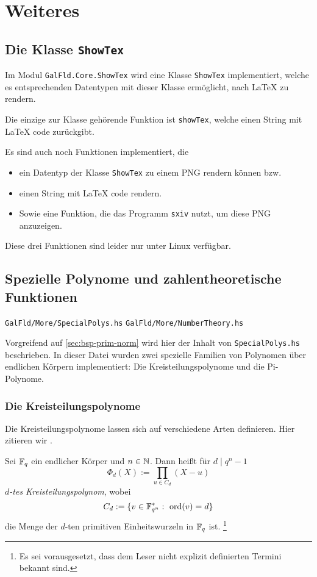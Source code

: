 \section{Weiteres}
\subsection{Die Klasse \texttt{ShowTex}}
Im Modul \texttt{GalFld.Core.ShowTex} wird eine Klasse \texttt{ShowTex}
implementiert, welche es entsprechenden Datentypen mit dieser Klasse
ermöglicht, nach \LaTeX{} zu rendern.

Die einzige zur Klasse gehörende Funktion ist \texttt{showTex}, welche einen
String mit \LaTeX{} code zurückgibt.

Es sind auch noch Funktionen implementiert, die 
\begin{itemize}
  \item ein Datentyp der Klasse \texttt{ShowTex} zu einem PNG rendern können
    bzw.
  \item einen String mit \LaTeX{} code rendern.
  \item Sowie eine Funktion, die das Programm \texttt{sxiv} nutzt, um diese PNG
    anzuzeigen.
\end{itemize}
Diese drei Funktionen sind leider nur unter Linux verfügbar.


\subsection{Spezielle Polynome und zahlentheoretische Funktionen}

\texttt{GalFld/More/SpecialPolys.hs}
\texttt{GalFld/More/NumberTheory.hs}

Vorgreifend auf \autoref{sec:bsp-prim-norm} wird hier der Inhalt von 
\texttt{SpecialPolys.hs} beschrieben. In dieser Datei wurden zwei spezielle
Familien von Polynomen über endlichen Körpern implementiert: Die
Kreisteilungspolynome und die Pi-Polynome.

\subsubsection{Die Kreisteilungspolynome}

Die Kreisteilungspolynome lassen sich auf verschiedene Arten definieren. Hier
zitieren wir \cite[Abschnitt 4]{hach2013eki}.

\begin{definition}[Kreisteilungspolynom]
  Sei $\mathbb{F}_q$ ein endlicher Körper und $n\in \mathbb{N}$. Dann heißt für 
  $d\mid q^n-1$
  \[ \Phi_d(X) := \prod_{u \in C_d} (X-u)\]
  \emph{$d$-tes Kreisteilungspolynom}, wobei
  \[ C_d := \{ v\in \mathbb{F}_{q^n}^\ast:\ \operatorname{ord}(v) = d\}\]
  die Menge der $d$-ten primitiven Einheitswurzeln in $\mathbb{F}_q$ ist.%
  \footnote{Es sei vorausgesetzt, dass dem Leser nicht explizit definierten
  Termini bekannt sind.}
\end{definition}

